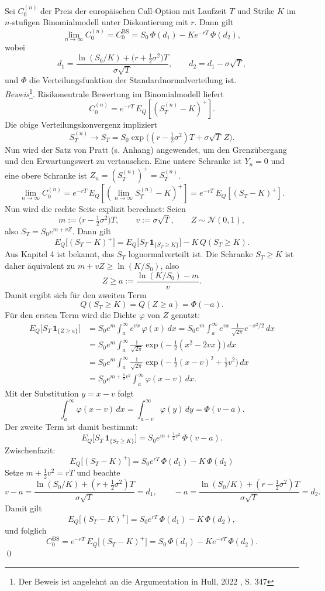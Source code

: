 \begin{satz}
Sei $C_0^{(n)}$ der Preis der europäischen Call-Option mit Laufzeit $T$ und Strike $K$
im $n$-stufigen Binomialmodell unter Diskontierung mit $r$. Dann gilt
$$
\lim_{n\to\infty} C_0^{(n)}
= C_0^{\mathrm{BS}}
= S_0\,\Phi(d_1) - K e^{-rT}\,\Phi(d_2),
$$
wobei
$$
d_1 = \frac{\ln(S_0/K) + \big(r + \tfrac12 \sigma^2\big)T}{\sigma \sqrt{T}},
\qquad
d_2 = d_1 - \sigma \sqrt{T},
$$
und $\Phi$ die Verteilungsfunktion der Standardnormalverteilung ist.
\\ \textit{Beweis}\footnote{Der Beweis ist angelehnt an die Argumentation in Hull, 2022 \cite{hull}, S. 347}. Risikoneutrale Bewertung im Binomialmodell liefert
$$
C_0^{(n)} = e^{-rT}\,E_Q\!\left[(S_T^{(n)} - K)^+\right].
$$
Die obige Verteilungskonvergenz impliziert
$$
S_T^{(n)} \longrightarrow S_T = S_0 \exp\!\big((r-\tfrac12\sigma^2)T + \sigma \sqrt{T}\,Z\big).
$$
Nun wird der Satz von Pratt (s. Anhang) angewendet, um den Grenzübergang und den Erwartungswert zu vertauschen. Eine untere Schranke ist $Y_n=0$ und eine obere Schranke ist $Z_n = (S_T^{(n)})^+ = S_T^{(n)}$. 
$$
\lim_{n\to\infty} C_0^{(n)} = e^{-rT}\,E_Q\!\left[ (\lim_{n\to\infty} S_T^{(n)}-K)^+ \right] = e^{-rT}\,E_Q\!\left[(S_T - K)^+\right].
$$
Nun wird die rechte Seite explizit berechnet: Seien
$$
m := \big(r-\tfrac12\sigma^2\big)T,\qquad v:=\sigma \sqrt{T},\qquad Z\sim \mathcal N(0,1),
$$
also $S_T = S_0 e^{m + v Z}$. Dann gilt
$$
E_Q\big[(S_T - K)^+\big]
= E_Q\big[S_T\,\mathbf 1_{\{S_T\ge K\}}\big] - K\,Q(S_T\ge K).
$$
Aus Kapitel 4 ist bekannt, das $S_T$ lognormalverteilt ist. Die Schranke $S_T\ge K$ ist daher äquivalent zu $m + vZ \ge \ln(K/S_0)$, also
$$
Z \ge a := \frac{\ln(K/S_0) - m}{v}.
$$
Damit ergibt sich für den zweiten Term
$$
Q(S_T\ge K) = Q(Z\ge a) = \Phi(-a).
$$
Für den ersten Term wird die Dichte $\varphi$ von $Z$ genutzt:
$$
\begin{aligned}
E_Q\big[S_T\,\mathbf 1_{\{Z\ge a\}}\big]
&= S_0 e^{m}\int_a^\infty e^{v x}\,\varphi(x)\,dx
= S_0 e^{m}\int_a^\infty e^{v x}\,\frac{1}{\sqrt{2\pi}}e^{-x^2/2}\,dx \\
&= S_0 e^{m}\int_a^\infty \frac{1}{\sqrt{2\pi}}
\exp\!\Big(-\tfrac12(x^2 - 2 v x)\Big)\,dx \\
&= S_0 e^{m}\int_a^\infty \frac{1}{\sqrt{2\pi}}
\exp\!\Big(-\tfrac12(x - v)^2 + \tfrac12 v^2\Big)\,dx \\
&= S_0 e^{m + \frac12 v^2}\int_a^\infty \varphi(x - v)\,dx.
\end{aligned}
$$
Mit der Substitution $y=x-v$ folgt
$$
\int_a^\infty \varphi(x - v)\,dx = \int_{a-v}^\infty \varphi(y)\,dy = \Phi(v-a).
$$
Der zweite Term ist damit bestimmt:
$$
E_Q\big[S_T\,\mathbf 1_{\{S_T\ge K\}}\big]
= S_0 e^{m + \frac12 v^2}\,\Phi(v-a).
$$
Zwischenfazit:
$$
E_Q\big[(S_T - K)^+\big] = S_0 e^{rT}\,\Phi(d_1) - K\,\Phi(d_2)
$$
Setze $m+\tfrac12 v^2 = rT$ und beachte
$$
v-a = \frac{\ln(S_0/K) + (r+\tfrac12\sigma^2)T}{\sigma \sqrt{T}} = d_1,
\qquad
-a = \frac{\ln(S_0/K) + (r-\tfrac12\sigma^2)T}{\sigma \sqrt{T}} = d_2.
$$
Damit gilt
$$
E_Q\big[(S_T - K)^+\big]
= S_0 e^{rT}\,\Phi(d_1) - K\,\Phi(d_2),
$$
und folglich
$$
C_0^{\mathrm{BS}} = e^{-rT}\,E_Q\big[(S_T - K)^+\big]
= S_0\,\Phi(d_1) - K e^{-rT}\,\Phi(d_2).
$$
\qed
\end{satz}

